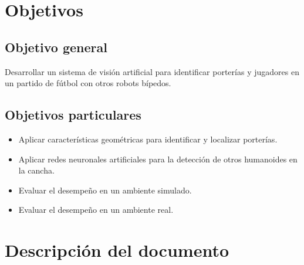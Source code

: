 \section{Objetivos}
\subsection*{Objetivo general}
Desarrollar un sistema de visión artificial para identificar porterías y jugadores en un partido de fútbol con otros robots bípedos.
\subsection*{Objetivos particulares}
\begin{itemize}
    \item Aplicar características geométricas para identificar y localizar porterías.
    \item Aplicar redes neuronales artificiales para la detección de otros humanoides en la cancha.
    \item Evaluar el desempeño en un ambiente simulado.
    \item Evaluar el desempeño en un ambiente real.
\end{itemize}
\section{Descripción del documento}
